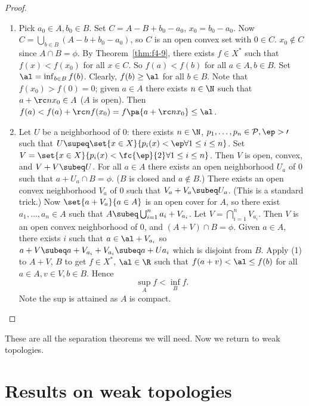 \begin{proof}
\begin{enumerate}
\item
Pick $a_0\in A,b_0\in B$. Set $C=A-B+b_0-a_0$, $x_0=b_0-a_0$. Now $C=\bigcup_{b\in B} (A-b+b_0-a_0)$, so $C$ is an open convex set with $0\in C$. $x_0\nin C$ since $A\cap B=\phi$. By Theorem~\ref{thm:f4-9}, there exists $f\in X^*$ such that $f(x)<f(x_0)$ for all $x\in C$. So $f(a)<f(b)$ for all $a\in A,b\in B$. Set $\al=\inf_{b\in B} f(b)$. Clearly, $f(b)\ge \al$ for all $b\in B$. Note that $f(x_0)>f(0)=0$; given $a\in A$ there exists $n\in \N$ such that $a+\rc nx_0\in A$ ($A$ is open). Then $f(a)<f(a)+\rc n f(x_0) = f\pa{a+\rc nx_0}\le \al$.
\item
Let $U$ be a neighborhood of 0: there exists $n\in \N$, $p_1,\ldots, p_n\in \cal P, \ep>0$ such that $U\supeq \set{x\in X}{p_i(x)<\ep \forall 1\le i\le n}$. Set $V=\set{x\in X}{p_i(x)<\fc{\ep}{2} \forall 1\le i\le n}$. Then $V$ is open, convex, and $V+V\subeq U$. 
For all $a\in A$ there exists an open neighborhood $U_a$ of 0 such that $a+U_a\cap B=\phi$. ($B$ is closed and $a\nin B$.) There exists an open convex neighborhood $V_a$ of 0 such that $V_a+V_a\subeq U_a$. (This is a standard trick.) Now $\set{a+V_a}{a\in A}$ is an open cover for $A$, so there exist $a_1,\ldots, a_n\in A$ such that $A\subeq\bigcup_{i=1}^n a_i+V_{a_i}$. Let $V=\bigcap_{i=1}^n V_{a_i}$. Then $V$ is an open convex neighborhood of 0, and $(A+V)\cap B=\phi$. Given $a\in A$, there exists $i$ such that $a\in \al+V_{a_i}$ so $a+V\subeq a+V_{a_i}+V_{a_i} \subeq a+Ua_i$ which is disjoint from $B$. Apply (1) to $A+V$, $B$ to get $f\in X^*$, $\al\in \R$ such that $f(a+v)<\al\le f(b)$ for all $a\in A,v\in V,b\in B$. Hence 
\[
\sup_A f<\inf_B f.
\]
Note the sup is attained as $A$ is compact.
\end{enumerate}
\end{proof}
These are all the separation theorems we will need. Now we return to weak topologies.
\section{Results on weak topologies}
